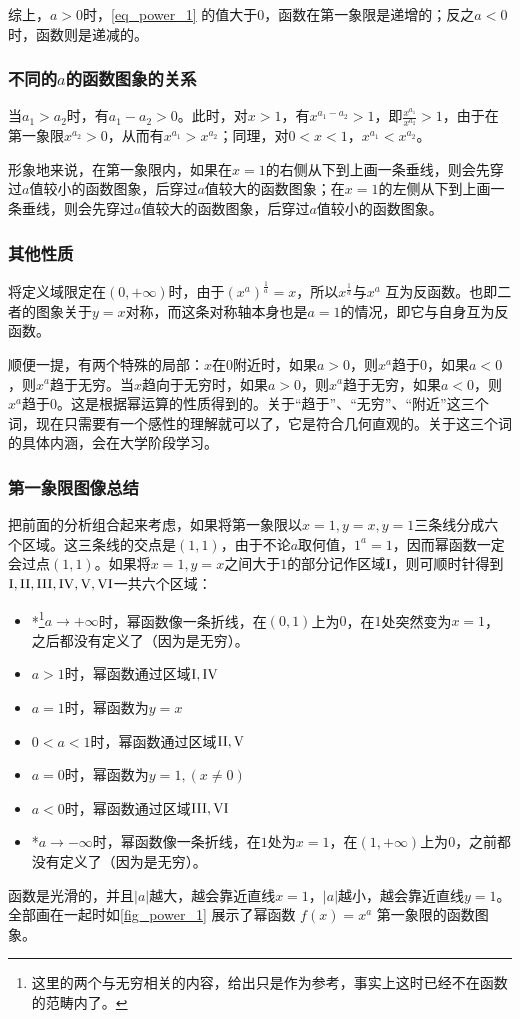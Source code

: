 综上，$a>0$时，\autoref{eq_power_1} 的值大于$0$，函数在第一象限是递增的；反之$a<0$时，函数则是递减的。

\subsubsection{不同的$a$的函数图象的关系}

当$a_1>a_2$时，有$a_1-a_2>0$。此时，对$x>1$，有$x^{a_1-a_2}>1$，即$\displaystyle \frac{x^{a_1}}{x^{a_2}}>1$，由于在第一象限$x^{a_2}>0$，从而有$x^{a_1}>x^{a_2}$；同理，对$0<x<1$，$x^{a_1}<x^{a_2}$。

形象地来说，在第一象限内，如果在$x=1$的右侧从下到上画一条垂线，则会先穿过$a$值较小的函数图象，后穿过$a$值较大的函数图象；在$x=1$的左侧从下到上画一条垂线，则会先穿过$a$值较大的函数图象，后穿过$a$值较小的函数图象。

\subsubsection{其他性质}

将定义域限定在$(0,+\infty)$时，由于$\displaystyle(x^a)^{\frac{1}{a}}=x$，所以$\displaystyle x^{\frac{1}{a}}$与$x^a$ 互为反函数。也即二者的图象关于$y=x$对称，而这条对称轴本身也是$a=1$的情况，即它与自身互为反函数。

顺便一提，有两个特殊的局部：$x$在$0$附近时，如果$a>0$，则$x^a$趋于$0$，如果$a<0$，则$x^a$趋于无穷。当$x$趋向于无穷时，如果$a>0$，则$x^a$趋于无穷，如果$a<0$，则$x^a$趋于$0$。这是根据幂运算的性质得到的。关于“趋于”、“无穷”、“附近”这三个词，现在只需要有一个感性的理解就可以了，它是符合几何直观的。关于这三个词的具体内涵，会在大学阶段学习。

\subsubsection{第一象限图像总结}

把前面的分析组合起来考虑，如果将第一象限以$x=1,y=x,y=1$三条线分成六个区域。这三条线的交点是$(1,1)$，由于不论$a$取何值，$1^a=1$，因而幂函数一定会过点$(1,1)$。如果将$x=1,y=x$之间大于$1$的部分记作区域$\rm{I}$，则可顺时针得到$\rm{I, II, III, IV, V, VI}$一共六个区域：
\begin{itemize}
\item *\footnote{这里的两个与无穷相关的内容，给出只是作为参考，事实上这时已经不在函数的范畴内了。}$a\to+\infty$时，幂函数像一条折线，在$(0,1)$上为$0$，在$1$处突然变为$x=1$，之后都没有定义了（因为是无穷）。
\item $a>1$时，幂函数通过区域$\rm{I,IV}$
\item $a=1$时，幂函数为$y=x$
\item $0<a<1$时，幂函数通过区域$\rm{II,V}$
\item $a=0$时，幂函数为$y=1,(x\neq0)$
\item $a<0$时，幂函数通过区域$\rm{III,VI}$
\item *$a\to-\infty$时，幂函数像一条折线，在$1$处为$x=1$，在$(1,+\infty)$上为$0$，之前都没有定义了（因为是无穷）。
\end{itemize}
函数是光滑的，并且$|a|$越大，越会靠近直线$x=1$，$|a|$越小，越会靠近直线$y=1$。全部画在一起时如\autoref{fig_power_1} 展示了幂函数 $f(x) = x^a$ 第一象限的函数图象。

